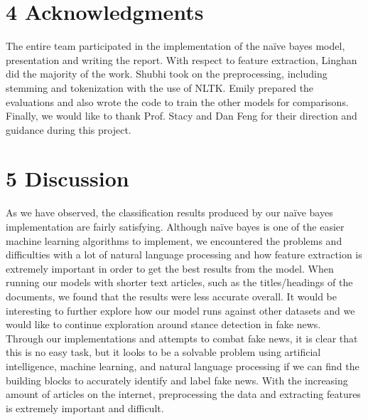 \documentclass{neu_handout}
\begin{document}
\section*{4 Acknowledgments}

The entire team participated in the implementation of the na\"ive bayes model, presentation and writing the report. With respect to feature extraction, Linghan did the majority of the work. Shubhi took on the preprocessing, including stemming and tokenization with the use of NLTK. Emily prepared the evaluations and also wrote the code to train the other models for comparisons. Finally, we would like to thank Prof. Stacy and Dan Feng for their direction and guidance during this project.

\section*{5 Discussion}
As we have observed, the classification results produced by our na\"ive bayes implementation are fairly satisfying. Although na\"ive bayes is one of the easier machine learning algorithms to implement, we encountered the problems and difficulties with a lot of natural language processing and how feature extraction is extremely important in order to get the best results from the model. When running our models with shorter text articles, such as the titles/headings of the documents, we found that the results were less accurate overall. It would be interesting to further explore how our model runs against other datasets and we would like to continue exploration around stance detection in fake news.\\

Through our implementations and attempts to combat fake news, it is clear that this is no easy task, but it looks to be a solvable problem using artificial intelligence, machine learning, and natural language processing if we can find the building blocks to accurately identify and label fake news. With the increasing amount of articles on the internet, preprocessing the data and extracting features is extremely important and difficult.
\end{document}
